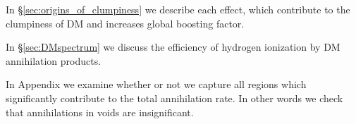 In \S\ref{sec:origins_of_clumpiness} we describe each effect, which contribute to the clumpiness of DM and increases global boosting factor.

In \S\ref{sec:DMspectrum} we discuss the efficiency of hydrogen ionization by DM annihilation products.

In Appendix we examine whether or not we capture all regions which significantly contribute to the total annihilation rate. In other words we check that annihilations in voids are insignificant.

